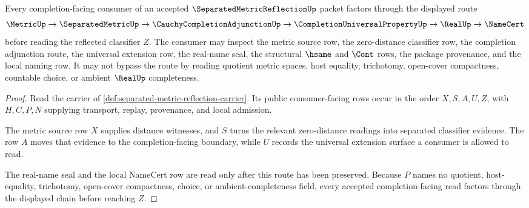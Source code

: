 \begin{theorem}
\label{thm:separated-metric-reflection-universal-route}
Every completion-facing consumer of an accepted $\SeparatedMetricReflectionUp$ packet factors through the displayed route
$$
\MetricUp\to\SeparatedMetricUp\to\CauchyCompletionAdjunctionUp\to\CompletionUniversalPropertyUp\to\RealUp\to\NameCert
$$
before reading the reflected classifier $Z$. The consumer may inspect the metric source row, the zero-distance classifier row, the completion adjunction route, the universal extension row, the real-name seal, the structural $\hsame$ and $\Cont$ rows, the package provenance, and the local naming row. It may not bypass the route by reading quotient metric spaces, host equality, trichotomy, open-cover compactness, countable choice, or ambient $\RealUp$ completeness.
\end{theorem}
\begin{proof}
Read the carrier of \autoref{def:separated-metric-reflection-carrier}. Its public consumer-facing rows occur in the order $X,S,A,U,Z$, with $H,C,P,N$ supplying transport, replay, provenance, and local admission.

The metric source row $X$ supplies distance witnesses, and $S$ turns the relevant zero-distance readings into separated classifier evidence. The row $A$ moves that evidence to the completion-facing boundary, while $U$ records the universal extension surface a consumer is allowed to read.

The real-name seal and the local NameCert row are read only after this route has been preserved. Because $P$ names no quotient, host-equality, trichotomy, open-cover compactness, choice, or ambient-completeness field, every accepted completion-facing read factors through the displayed chain before reaching $Z$.
\end{proof}

